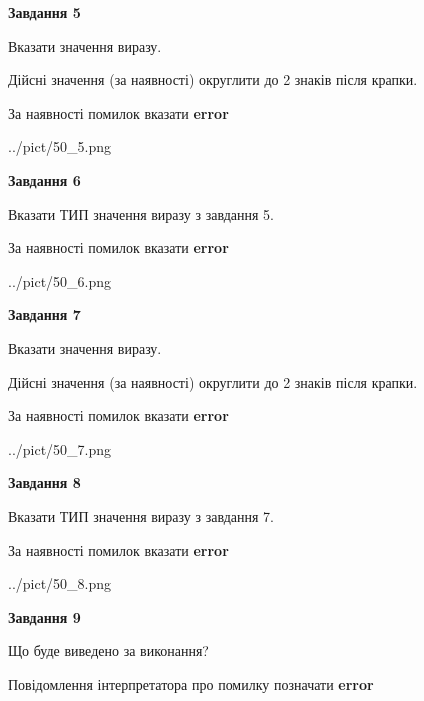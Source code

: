 \documentclass[11pt, ukrainian]{article}
\begin{document}
{\begin {large}
{\begin {center}\textbf{Завдання 5}\end {center}}\par
Вказати значення виразу. \par
Дійсні значення (за наявності) округлити до 2 знаків після крапки. \par
За наявності помилок вказати \textbf{error}

\begin{center}
	{../pict/50_5.png}
\end{center}
\newpage

{\begin {center}\textbf{Завдання 6}\end {center}}\par
Вказати ТИП значення виразу з завдання 5. \par
За наявності помилок вказати \textbf{error}

\begin{center}
	{../pict/50_6.png}
\end{center}
\newpage

{\begin {center}\textbf{Завдання 7}\end {center}}\par
Вказати значення виразу. \par
Дійсні значення (за наявності) округлити до 2 знаків після крапки. \par
За наявності помилок вказати \textbf{error}

\begin{center}
	{../pict/50_7.png}
\end{center}
\newpage

{\begin {center}\textbf{Завдання 8}\end {center}}\par
Вказати ТИП значення виразу з завдання 7. \par
За наявності помилок вказати \textbf{error}

\begin{center}
	{../pict/50_8.png}
\end{center}
\newpage

{\begin {center}\textbf{Завдання 9}\end {center}}\par
Що буде виведено за виконання? \par
Повідомлення інтерпретатора про помилку позначати \textbf{error}


\end{large}}
\end{document}
